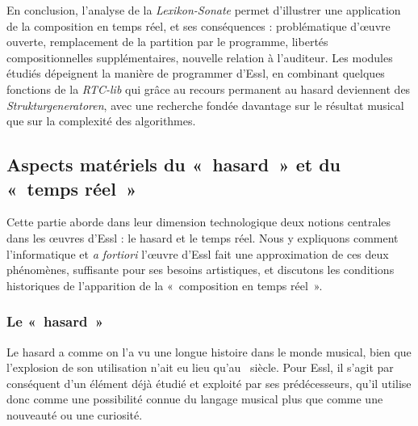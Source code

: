 \documentclass[a4paper,12pt]{article}
\newcommand{\guill}[1]{«~#1~»}
\begin{document}
En conclusion, l'analyse de la \emph{Lexikon-Sonate} permet d'illustrer une application de la composition en temps réel, et ses conséquences : problématique d'œuvre ouverte, remplacement de la partition par le programme, libertés compositionnelles supplémentaires, nouvelle relation à l'auditeur. Les modules étudiés dépeignent la manière de programmer d'Essl, en combinant quelques fonctions de la \emph{RTC-lib} qui grâce au recours permanent au hasard deviennent des \emph{Strukturgeneratoren}, avec une recherche fondée davantage sur le résultat musical que sur la complexité des algorithmes.


\subsection{Aspects matériels du \guill{hasard} et du \guill{temps réel}}
\label{aspectsmateriels}

Cette partie aborde dans leur dimension technologique deux notions centrales dans les œuvres d'Essl : le hasard et le temps réel. Nous y expliquons comment l'informatique et \emph{a fortiori} l'œuvre d'Essl fait une approximation de ces deux phénomènes, suffisante pour ses besoins artistiques, et discutons les conditions historiques de l'apparition de la \guill{composition en temps réel}.

\subsubsection{Le \guill{hasard}}
\label{hasard}

Le hasard a comme on l'a vu une longue histoire dans le monde musical, bien que l'explosion de son utilisation n'ait eu lieu qu'au \XXe~siècle. Pour Essl, il s'agit par conséquent d'un élément déjà étudié et exploité par ses prédécesseurs, qu'il utilise donc comme une possibilité connue du langage musical plus que comme une nouveauté ou une curiosité.
\end{document}
